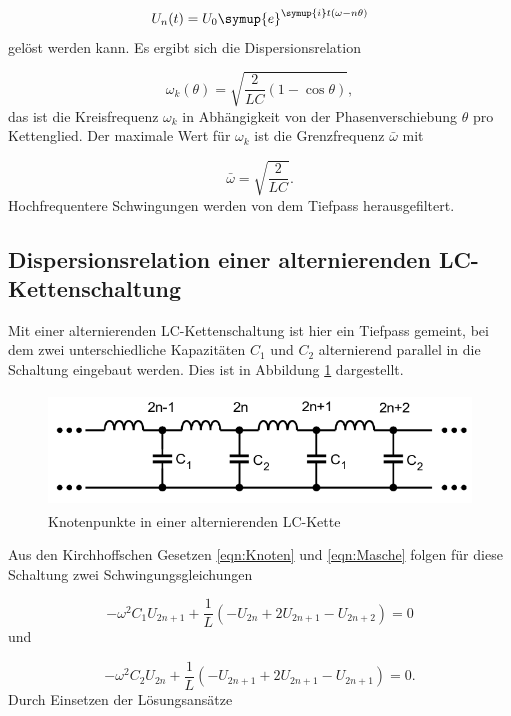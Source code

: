 \begin{equation}
  U_{n}(t) = U_0 \symup{e}^{\symup{i}t (\omega - n \theta)}
\end{equation}
gelöst werden kann.
Es ergibt sich die Dispersionsrelation

\begin{equation}
  \omega_k(\theta) = \sqrt{\frac{2}{LC}(1-\cos\theta)},
\end{equation}
das ist die Kreisfrequenz
$\omega_k$ in Abhängigkeit von der Phasenverschiebung $\theta$ pro Kettenglied.
Der maximale Wert für $\omega_k$ ist die Grenzfrequenz $\bar{\omega}$
mit

\begin{equation}
  \bar{\omega} = \sqrt{\frac{2}{LC}}.
\end{equation}
Hochfrequentere Schwingungen werden von dem Tiefpass herausgefiltert.


\subsection{Dispersionsrelation einer alternierenden LC-Kettenschaltung}

Mit einer alternierenden LC-Kettenschaltung ist hier ein Tiefpass gemeint,
bei dem zwei unterschiedliche Kapazitäten $C_1$ und $C_2$ alternierend
parallel in die Schaltung eingebaut werden. Dies ist in Abbildung
\ref{fig:KetteLC1C2} dargestellt.

\newpage

\begin{figure}
  \centering
  \includegraphics[height=3cm]{KetteLC1C2.png}
  \caption{Knotenpunkte in einer alternierenden LC-Kette}
  \label{fig:KetteLC1C2}
\end{figure}
Aus den Kirchhoffschen Gesetzen \eqref{eqn:Knoten} und \eqref{eqn:Masche}
folgen für diese Schaltung zwei Schwingungsgleichungen

\begin{equation}
  -\omega^2 C_1 U_{2n+1} + \frac{1}{L}(-U_{2n}+2U_{2n+1}-U_{2n+2}) = 0
\end{equation}
und

\begin{equation}
  -\omega^2 C_2 U_{2n} + \frac{1}{L}(-U_{2n+1}+2U_{2n+1}-U_{2n+1}) = 0.
\end{equation}
Durch Einsetzen der Lösungsansätze

